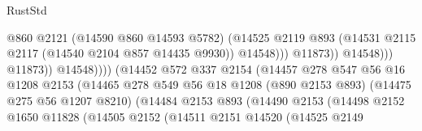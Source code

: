 \begin{lexlean}{RustStd}
\begin{coremodule}
                                                          @860
                                                          @2121
                                                          (@14590 @860 @14593 @5782)
                                                          (@14525
                                                            @2119
                                                            @893
                                                            (@14531
                                                              @2115
                                                              @2117
                                                              (@14540 @2104 @857 @14435 @9930))
                                                            @14548)))
                                                      @11873))
                                                  @14548)))
                                            @11873))
                                        @14548))))
                                (@14452
                                  @572
                                  @337
                                  @2154
                                  (@14457
                                    @278
                                    @547
                                    @56
                                    @16
                                    @1208
                                    @2153
                                    (@14465
                                      @278
                                      @549
                                      @56
                                      @18
                                      @1208
                                      (@890 @2153 @893)
                                      (@14475 @275 @56 @1207 @8210)
                                      (@14484
                                        @2153
                                        @893
                                        (@14490
                                          @2153
                                          (@14498
                                            @2152
                                            @1650
                                            @11828
                                            (@14505
                                              @2152
                                              (@14511
                                                @2151
                                                @14520
                                                (@14525
                                                  @2149

\end{coremodule}
\end{lexlean}
